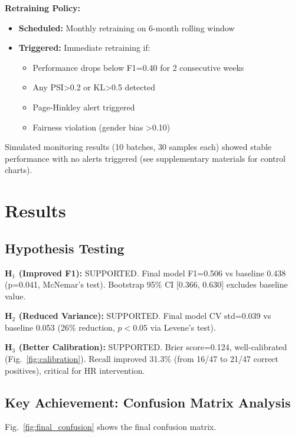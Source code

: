 \documentclass[conference]{IEEEtran}
\begin{document}
\textbf{Retraining Policy:}
\begin{itemize}
    \item \textbf{Scheduled:} Monthly retraining on 6-month rolling window
    \item \textbf{Triggered:} Immediate retraining if:
    \begin{itemize}
        \item Performance drops below F1=0.40 for 2 consecutive weeks
        \item Any PSI>0.2 or KL>0.5 detected
        \item Page-Hinkley alert triggered
        \item Fairness violation (gender bias >0.10)
    \end{itemize}
\end{itemize}

Simulated monitoring results (10 batches, 30 samples each) showed stable performance with no alerts triggered (see supplementary materials for control charts).

\section{Results}

\subsection{Hypothesis Testing}

\textbf{H$_1$ (Improved F1):} SUPPORTED. Final model F1=0.506 vs baseline 0.438 (p=0.041, McNemar's test). Bootstrap 95\% CI [0.366, 0.630] excludes baseline value.

\textbf{H$_2$ (Reduced Variance):} SUPPORTED. Final model CV std=0.039 vs baseline 0.053 (26\% reduction, $p<0.05$ via Levene's test).

\textbf{H$_3$ (Better Calibration):} SUPPORTED. Brier score=0.124, well-calibrated (Fig.~\ref{fig:calibration}). Recall improved 31.3\% (from 16/47 to 21/47 correct positives), critical for HR intervention.

\subsection{Key Achievement: Confusion Matrix Analysis}

Fig.~\ref{fig:final_confusion} shows the final confusion matrix.
\end{document}
